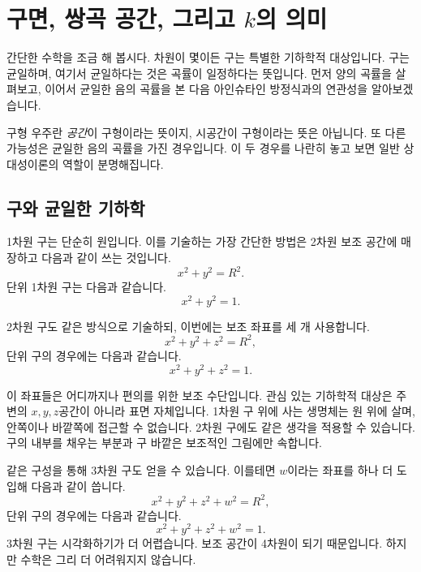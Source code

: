\chapter{구면, 쌍곡 공간, 그리고 \(k\)의 의미}

간단한 수학을 조금 해 봅시다. 차원이 몇이든 구는 특별한 기하학적 대상입니다. 구는 균일하며, 여기서 균일하다는 것은 곡률이 일정하다는 뜻입니다. 먼저 양의 곡률을 살펴보고, 이어서 균일한 음의 곡률을 본 다음 아인슈타인 방정식과의 연관성을 알아보겠습니다.

구형 우주란 \emph{공간}이 구형이라는 뜻이지, 시공간이 구형이라는 뜻은 아닙니다. 또 다른 가능성은 균일한 음의 곡률을 가진 경우입니다. 이 두 경우를 나란히 놓고 보면 일반 상대성이론의 역할이 분명해집니다.

\section{구와 균일한 기하학}

1차원 구는 단순히 원입니다. 이를 기술하는 가장 간단한 방법은 2차원 보조 공간에 매장하고 다음과 같이 쓰는 것입니다.
\begin{equation}
x^2+y^2=R^2.
\end{equation}
단위 1차원 구는 다음과 같습니다.
\begin{equation}
x^2+y^2=1.
\end{equation}

2차원 구도 같은 방식으로 기술하되, 이번에는 보조 좌표를 세 개 사용합니다.
\begin{equation}
x^2+y^2+z^2=R^2,
\end{equation}
단위 구의 경우에는 다음과 같습니다.
\begin{equation}
x^2+y^2+z^2=1.
\end{equation}

이 좌표들은 어디까지나 편의를 위한 보조 수단입니다. 관심 있는 기하학적 대상은 주변의 \(x,y,z\)공간이 아니라 표면 자체입니다. 1차원 구 위에 사는 생명체는 원 위에 살며, 안쪽이나 바깥쪽에 접근할 수 없습니다. 2차원 구에도 같은 생각을 적용할 수 있습니다. 구의 내부를 채우는 부분과 구 바깥은 보조적인 그림에만 속합니다.

같은 구성을 통해 3차원 구도 얻을 수 있습니다. 이를테면 \(w\)이라는 좌표를 하나 더 도입해 다음과 같이 씁니다.
\begin{equation}
x^2+y^2+z^2+w^2=R^2,
\end{equation}
단위 구의 경우에는 다음과 같습니다.
\begin{equation}
x^2+y^2+z^2+w^2=1.
\end{equation}
3차원 구는 시각화하기가 더 어렵습니다. 보조 공간이 4차원이 되기 때문입니다. 하지만 수학은 그리 더 어려워지지 않습니다.

